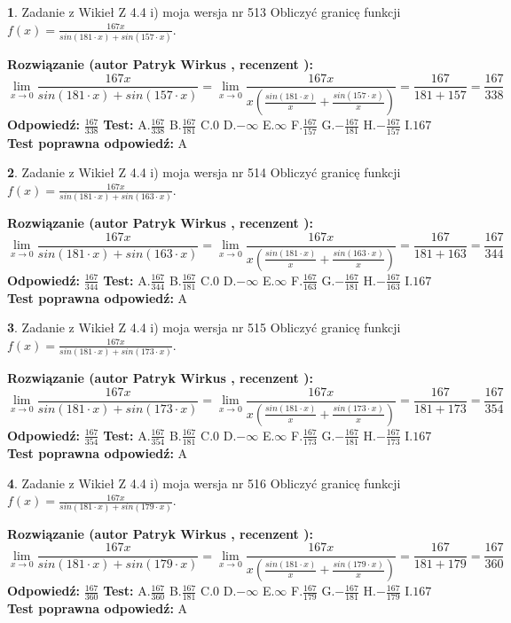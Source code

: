 \documentclass[12pt, a4paper]{article}
\theoremstyle{definition} %
\newtheorem{zad}{}
\newcommand{\zadStart}[1]{\begin{zad}#1\newline}
\newcommand{\zadStop}{\end{zad}}
\newcommand{\rozwStart}[2]{\noindent \textbf{Rozwiązanie (autor #1 , recenzent #2): }\newline}
\newcommand{\rozwStop}{\newline}
\newcommand{\odpStart}{\noindent \textbf{Odpowiedź:}\newline}
\newcommand{\odpStop}{\newline}
\newcommand{\testStart}{\noindent \textbf{Test:}\newline}
\newcommand{\testStop}{\newline}
\newcommand{\kluczStart}{\noindent \textbf{Test poprawna odpowiedź:}\newline}
\newcommand{\kluczStop}{\newline}
\begin{document}
\zadStart{Zadanie z Wikieł Z 4.4 i) moja wersja nr 513}
Obliczyć granicę funkcji $f(x)=\frac{167x}{sin(181\cdot x) +sin(157\cdot x)}$.
\zadStop
\rozwStart{Patryk Wirkus}{}
$$\lim\limits_{x\to 0}\frac{167x}{sin(181\cdot x) +sin(157\cdot x)}=\lim\limits_{x\to 0}\frac{167x}{x(\frac{sin(181\cdot x)}{x}+\frac{sin(157\cdot x)}{x})}=\frac{167}{181+157} = \frac{167}{338}$$
\rozwStop
\odpStart
$\frac{167}{338}$
\odpStop
\testStart
A.$\frac{167}{338}$
B.$\frac{167}{181}$
C.$0$
D.$-\infty$
E.$\infty$
F.$\frac{167}{157}$
G.$-\frac{167}{181}$
H.$-\frac{167}{157}$
I.$167$
\testStop
\kluczStart
A
\kluczStop



\zadStart{Zadanie z Wikieł Z 4.4 i) moja wersja nr 514}
Obliczyć granicę funkcji $f(x)=\frac{167x}{sin(181\cdot x) +sin(163\cdot x)}$.
\zadStop
\rozwStart{Patryk Wirkus}{}
$$\lim\limits_{x\to 0}\frac{167x}{sin(181\cdot x) +sin(163\cdot x)}=\lim\limits_{x\to 0}\frac{167x}{x(\frac{sin(181\cdot x)}{x}+\frac{sin(163\cdot x)}{x})}=\frac{167}{181+163} = \frac{167}{344}$$
\rozwStop
\odpStart
$\frac{167}{344}$
\odpStop
\testStart
A.$\frac{167}{344}$
B.$\frac{167}{181}$
C.$0$
D.$-\infty$
E.$\infty$
F.$\frac{167}{163}$
G.$-\frac{167}{181}$
H.$-\frac{167}{163}$
I.$167$
\testStop
\kluczStart
A
\kluczStop



\zadStart{Zadanie z Wikieł Z 4.4 i) moja wersja nr 515}
Obliczyć granicę funkcji $f(x)=\frac{167x}{sin(181\cdot x) +sin(173\cdot x)}$.
\zadStop
\rozwStart{Patryk Wirkus}{}
$$\lim\limits_{x\to 0}\frac{167x}{sin(181\cdot x) +sin(173\cdot x)}=\lim\limits_{x\to 0}\frac{167x}{x(\frac{sin(181\cdot x)}{x}+\frac{sin(173\cdot x)}{x})}=\frac{167}{181+173} = \frac{167}{354}$$
\rozwStop
\odpStart
$\frac{167}{354}$
\odpStop
\testStart
A.$\frac{167}{354}$
B.$\frac{167}{181}$
C.$0$
D.$-\infty$
E.$\infty$
F.$\frac{167}{173}$
G.$-\frac{167}{181}$
H.$-\frac{167}{173}$
I.$167$
\testStop
\kluczStart
A
\kluczStop



\zadStart{Zadanie z Wikieł Z 4.4 i) moja wersja nr 516}
Obliczyć granicę funkcji $f(x)=\frac{167x}{sin(181\cdot x) +sin(179\cdot x)}$.
\zadStop
\rozwStart{Patryk Wirkus}{}
$$\lim\limits_{x\to 0}\frac{167x}{sin(181\cdot x) +sin(179\cdot x)}=\lim\limits_{x\to 0}\frac{167x}{x(\frac{sin(181\cdot x)}{x}+\frac{sin(179\cdot x)}{x})}=\frac{167}{181+179} = \frac{167}{360}$$
\rozwStop
\odpStart
$\frac{167}{360}$
\odpStop
\testStart
A.$\frac{167}{360}$
B.$\frac{167}{181}$
C.$0$
D.$-\infty$
E.$\infty$
F.$\frac{167}{179}$
G.$-\frac{167}{181}$
H.$-\frac{167}{179}$
I.$167$
\testStop
\kluczStart
A
\kluczStop
\end{document}
